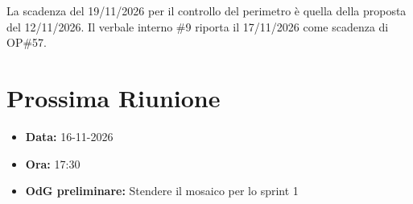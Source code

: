 \documentclass[a4paper, 11pt]{article}
\begin{document}
La scadenza del 19/11/2026 per il controllo del perimetro è quella della proposta del 12/11/2026. Il verbale interno \#9 riporta il 17/11/2026 come scadenza di OP\#57.

\vspace{0.5cm}
\section{Prossima Riunione}
\begin{itemize}
    \item \textbf{Data:} 16-11-2026
    \item \textbf{Ora:} 17:30
    \item \textbf{OdG preliminare:} Stendere il mosaico per lo sprint 1 
\end{itemize}
\end{document}
